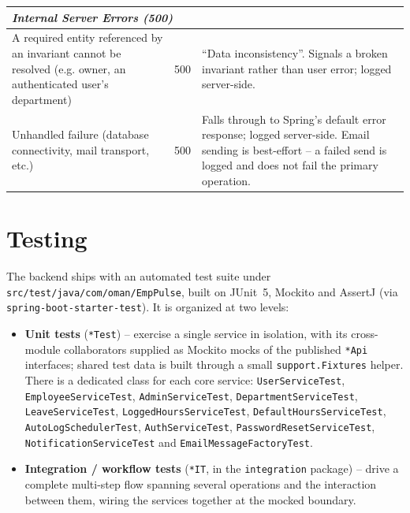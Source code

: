 \documentclass[11pt,a4paper]{article}
\begin{document}
\begin{longtable}{p{6cm} p{1.5cm} p{6cm}}
\midrule
\multicolumn{3}{l}{\textit{Internal Server Errors (500)}} \\
\midrule
A required entity referenced by an invariant cannot be resolved (e.g. owner, an authenticated user's department) & 500 & ``Data inconsistency''. Signals a broken invariant rather than user error; logged server-side. \\
Unhandled failure (database connectivity, mail transport, etc.) & 500 & Falls through to Spring's default error response; logged server-side. Email sending is best-effort -- a failed send is logged and does not fail the primary operation. \\
\bottomrule
\end{longtable}

\section{Testing}
\label{sec:testing}

The backend ships with an automated test suite under
\texttt{src/test/java/com/oman/EmpPulse}, built on JUnit~5, Mockito and AssertJ
(via \texttt{spring-boot-starter-test}). It is organized at two levels:

\begin{itemize}[leftmargin=1.5em]
    \item \textbf{Unit tests} (\texttt{*Test}) -- exercise a single service in isolation, with its
    cross-module collaborators supplied as Mockito mocks of the published \texttt{*Api} interfaces;
    shared test data is built through a small \texttt{support.Fixtures} helper. There is a dedicated
    class for each core service: \texttt{UserServiceTest}, \texttt{EmployeeServiceTest},
    \texttt{AdminServiceTest}, \texttt{DepartmentServiceTest}, \texttt{LeaveServiceTest},
    \texttt{LoggedHoursServiceTest}, \texttt{DefaultHoursServiceTest}, \texttt{AutoLogSchedulerTest},
    \texttt{AuthServiceTest}, \texttt{PasswordResetServiceTest}, \texttt{NotificationServiceTest}
    and \texttt{EmailMessageFactoryTest}.
    \item \textbf{Integration / workflow tests} (\texttt{*IT}, in the \texttt{integration} package) --
    drive a complete multi-step flow spanning several operations and the interaction between them,
    wiring the services together at the mocked boundary.
\end{itemize}
\end{document}
